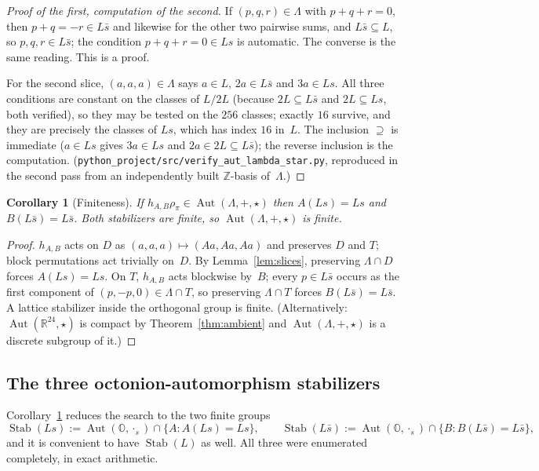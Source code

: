 \documentclass[11pt]{amsart}
\newcommand{\LL}{\Lambda}
\newcommand{\OO}{\mathbb{O}}
\newcommand{\ZZ}{\mathbb{Z}}
\newcommand{\RR}{\mathbb{R}}
\DeclareMathOperator{\Aut}{Aut}
\DeclareMathOperator{\Stab}{Stab}
\newtheorem{corollary}[theorem]{Corollary}
\theoremstyle{definition}
\theoremstyle{remark}
\begin{document}
\begin{proof}[Proof of the first, computation of the second]
If $(p,q,r) \in \LL$ with $p+q+r = 0$, then $p + q = -r \in L\bar s$ and
likewise for the other two pairwise sums, and $L\bar s \subseteq L$, so
$p, q, r \in L\bar s$; the condition $p+q+r = 0 \in Ls$ is automatic. The
converse is the same reading. This is a proof.

For the second slice, $(a,a,a) \in \LL$ says $a \in L$, $2a \in L\bar s$ and
$3a \in Ls$. All three conditions are constant on the classes of $L/2L$
(because $2L \subseteq L\bar s$ and $2L \subseteq Ls$, both verified), so
they may be tested on the $256$ classes; exactly $16$ survive, and they are
precisely the classes of $Ls$, which has index $16$ in~$L$. The inclusion
$\supseteq$ is immediate ($a \in Ls$ gives $3a \in Ls$ and $2a \in 2L
\subseteq L\bar s$); the reverse inclusion is the computation.
(\texttt{python\_project/src/verify\_aut\_lambda\_star.py}, reproduced in the
second pass from an independently built $\ZZ$-basis of~$\LL$.)
\end{proof}

\begin{corollary}[Finiteness]\label{cor:finite}
If $h_{A,B}\rho_\pi \in \Aut(\LL,+,\star)$ then $A(Ls) = Ls$ and
$B(L\bar s) = L\bar s$. Both stabilizers are finite, so
$\Aut(\LL,+,\star)$ is finite.
\end{corollary}

\begin{proof}
$h_{A,B}$ acts on $D$ as $(a,a,a) \mapsto (Aa,Aa,Aa)$ and preserves $D$ and
$T$; block permutations act trivially on~$D$. By Lemma~\ref{lem:slices},
preserving $\LL \cap D$ forces $A(Ls) = Ls$. On $T$, $h_{A,B}$ acts
blockwise by~$B$; every $p \in L\bar s$ occurs as the first component of
$(p,-p,0) \in \LL \cap T$, so preserving $\LL \cap T$ forces
$B(L\bar s) = L\bar s$. A lattice stabilizer inside the orthogonal group is
finite. (Alternatively: $\Aut(\RR^{24},\star)$ is compact by
Theorem~\ref{thm:ambient} and $\Aut(\LL,+,\star)$ is a discrete subgroup of
it.)
\end{proof}

\subsection{The three octonion-automorphism stabilizers}

Corollary~\ref{cor:finite} reduces the search to the two finite groups
\[
  \Stab(Ls) := \Aut(\OO,\cdot_s) \cap \{A : A(Ls) = Ls\},
  \qquad
  \Stab(L\bar s) := \Aut(\OO,\cdot_s) \cap \{B : B(L\bar s) = L\bar s\},
\]
and it is convenient to have $\Stab(L)$ as well. All three were enumerated
completely, in exact arithmetic.
\end{document}

